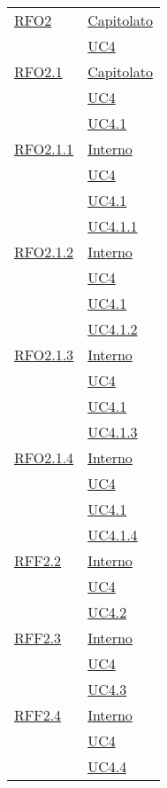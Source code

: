 \begin{longtable}{|>{\centering}m{5cm}|m{5cm}<{\centering}|}
\hyperlink{RFO2}{RFO2} & \hyperlink{Capitolato}{Capitolato}\\
& \hyperref[UC4]{UC4}\\ \hline

\hyperlink{RFO2.1}{RFO2.1} & \hyperlink{Capitolato}{Capitolato}\\
& \hyperref[UC4]{UC4}\\
& \hyperref[UC4.1]{UC4.1}\\ \hline

\hyperlink{RFO2.1.1}{RFO2.1.1} & \hyperlink{Interno}{Interno}\\
& \hyperref[UC4]{UC4}\\
& \hyperref[UC4.1]{UC4.1}\\
& \hyperref[UC4.1.1]{UC4.1.1}\\ \hline

\hyperlink{RFO2.1.2}{RFO2.1.2} & \hyperlink{Interno}{Interno}\\
& \hyperref[UC4]{UC4}\\
& \hyperref[UC4.1]{UC4.1}\\
& \hyperref[UC4.1.2]{UC4.1.2}\\ \hline

\hyperlink{RFO2.1.3}{RFO2.1.3} & \hyperlink{Interno}{Interno}\\
& \hyperref[UC4]{UC4}\\
& \hyperref[UC4.1]{UC4.1}\\
& \hyperref[UC4.1.3]{UC4.1.3}\\ \hline

\hyperlink{RFF2.1.4}{RFO2.1.4} & \hyperlink{Interno}{Interno}\\
& \hyperref[UC4]{UC4}\\
& \hyperref[UC4.1]{UC4.1}\\
& \hyperref[UC4.1.4]{UC4.1.4}\\ \hline

\hyperlink{RFF2.2}{RFF2.2} & \hyperlink{Interno}{Interno}\\
& \hyperref[UC4]{UC4}\\
& \hyperref[UC4.2]{UC4.2}\\ \hline

\hyperlink{RFF2.3}{RFF2.3} & \hyperlink{Interno}{Interno}\\
& \hyperref[UC4]{UC4}\\
& \hyperref[UC4.3]{UC4.3}\\ \hline

\hyperlink{RFF2.4}{RFF2.4} & \hyperlink{Interno}{Interno}\\
& \hyperref[UC4]{UC4}\\
& \hyperref[UC4.4]{UC4.4}\\ \hline


\end{longtable}
